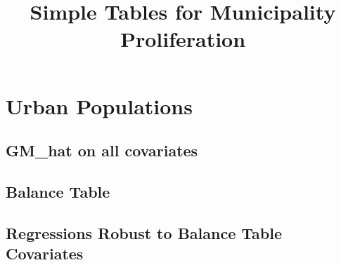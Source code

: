 \documentclass{article}
\title{Simple Tables for Municipality Proliferation}
\begin{document}
\maketitle
\tableofcontents
{\footnotesize 
\listoffigures
\listoftables}
\clearpage

\section{Urban Populations}
\subsection{GM\_hat on all covariates}

\clearpage
\subsection{Balance Table}

\clearpage

\clearpage

\clearpage

\clearpage
\subsection{Regressions Robust to Balance Table Covariates}
\begin{landscape}

\clearpage

\clearpage

\clearpage

\clearpage

\clearpage

\clearpage

\clearpage

\clearpage

\clearpage

\clearpage

\clearpage

\clearpage

\clearpage

\clearpage

\clearpage

\clearpage
\end{landscape}
\end{document}
